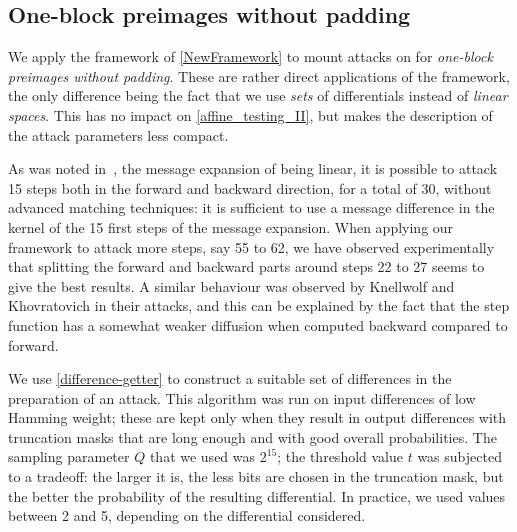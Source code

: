 \subsection{One-block preimages without padding}
\label{sec:one_wo_pad}
  We apply the framework of \autoref{NewFramework} to mount attacks on \shaone
  for \emph{one-block preimages without padding}. These are rather direct applications
  of the framework, the only difference being the fact that we use \emph{sets} of
  differentials instead of \emph{linear spaces}. This has no impact
  on \autoref{affine_testing_II}, but makes the description of the attack parameters
  less compact.

  As was noted in~\cite{DBLP:conf/crypto/KnellwolfK12}, the message expansion of \shaone being linear, it is possible to attack 15 steps both in the forward and backward 
  direction, for a total of 30, without advanced matching techniques: it is sufficient to use a message difference
  in the kernel of the 15 first steps of
  the message expansion. 
  When applying our framework to attack more steps, say 55 to 62, we have observed experimentally
  that splitting the forward and backward parts around steps 22 to 27 seems to give the best results.
  A similar behaviour was observed by Knellwolf and Khovratovich in their attacks, and this can be explained by the fact
  that the \shaone step function has a somewhat weaker diffusion when computed backward compared to forward.

  We use \autoref{difference-getter} to
  construct a suitable set of differences in the preparation of an attack.
  This algorithm was run on input differences of low Hamming weight; these
  are kept only when they result in output differences
  with truncation masks that are long enough and with good overall
  probabilities. The sampling parameter $Q$ that we used was $2^{15}$;
  the threshold value $t$ was subjected to a tradeoff: the larger it is,
  the less bits are chosen in the truncation mask, but the better the probability of
  the resulting differential. In practice, we used values between 2 and 5, 
  depending on the differential considered. 


